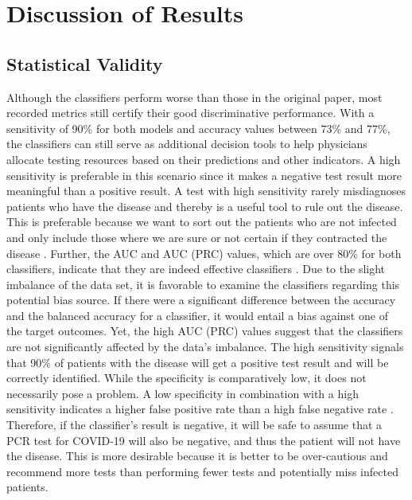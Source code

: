 \section{Discussion of Results}
\subsection{Statistical Validity}
Although the classifiers perform worse than those in the original paper, 
most recorded metrics still certify their good discriminative performance.
With a sensitivity of 90\% for both models and accuracy values between 73\% and 
77\%, the classifiers can still serve as additional decision tools to help 
physicians allocate testing resources based on their 
predictions and other indicators. 
A high sensitivity is preferable in this scenario since it makes a negative test 
result more meaningful than a positive result. A test with high sensitivity 
rarely misdiagnoses patients who have the disease and thereby is a useful tool 
to rule out the disease. This is preferable because we want to sort out the 
patients who are not infected and only include those where we are sure or not 
certain if they contracted the disease \cite{RN168}.
Further, the AUC and AUC (PRC) values, which are over 80\% 
for both classifiers, indicate that they are indeed effective classifiers 
\cite{RN167}.
Due to the slight imbalance of the data set, it is  favorable to examine the 
classifiers regarding this potential bias source. If there were a 
significant difference between the accuracy and the balanced accuracy for a 
classifier, it 
would entail a bias against one of the target outcomes. Yet, the high AUC 
(PRC) values suggest that the classifiers are not significantly affected by the 
data's imbalance.
The high sensitivity signals that 90\% of 
patients with the disease will get a positive test result and will be correctly 
identified. 
While the specificity is comparatively low, it does not necessarily pose a 
problem. A low specificity in combination with a high sensitivity indicates a 
higher false positive rate than a high false negative rate \cite{RN168}.
Therefore, if the classifier's result is negative, it will be safe to 
assume that a PCR test for COVID-19 will also be negative, and thus the patient 
will not have the disease.
This is more desirable because it is better to be over-cautious and recommend 
more tests than performing fewer tests and potentially miss infected patients.
